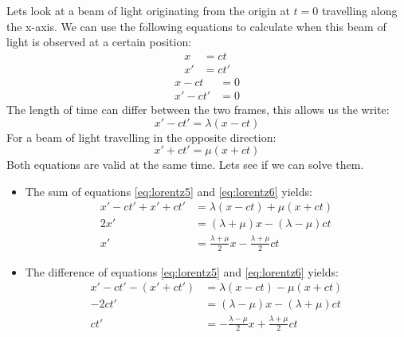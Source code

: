 \documentclass[12pt,a4paper]{article}
\numberwithin{equation}{section}
\numberwithin{figure}{section}
\numberwithin{table}{section}
\begin{document}
Lets look at a beam of light originating from the origin at $t=0$ travelling along the x-axis. We can use the following equations to calculate when this beam of light is observed at a certain position:
\begin{equation}\label{eq:lorentz3}\begin{aligned}
x &= ct \\
x' &= ct'
\end{aligned}\end{equation}
\begin{equation}\label{eq:lorentz4}\begin{aligned}
x - ct &= 0 \\
x' - ct'&= 0
\end{aligned}\end{equation}
The length of time can differ between the two frames, this allows us the write:
\begin{equation}\label{eq:lorentz5}
x' - ct' = \lambda (x - ct)
\end{equation}
For a beam of light travelling in the opposite direction:
\begin{equation}\label{eq:lorentz6}
x' + ct' = \mu (x + ct)
\end{equation}
Both equations are valid at the same time. Lets see if we can solve them.
\begin{itemize}
\item The sum of equations \ref{eq:lorentz5} and \ref{eq:lorentz6} yields:
\begin{align}\label{eq:lorentz789}
x' - ct' + x' + ct' &= \lambda (x - ct) + \mu (x + ct) \\
2x' &= (\lambda + \mu)x - (\lambda - \mu)ct \\
x' &= \frac{\lambda + \mu}{2}x - \frac{\lambda + \mu}{2} ct
\end{align}

\item The difference of equations \ref{eq:lorentz5} and \ref{eq:lorentz6} yields:
\begin{align}\label{eq:lorentz101112}
x' - ct' - (x' + ct') &= \lambda (x - ct) - \mu (x + ct) \\
-2ct' &= (\lambda - \mu)x - (\lambda + \mu)ct \\
ct' &= -\frac{\lambda - \mu}{2}x + \frac{\lambda + \mu}{2} ct
\end{align}
\end{itemize}
\end{document}
